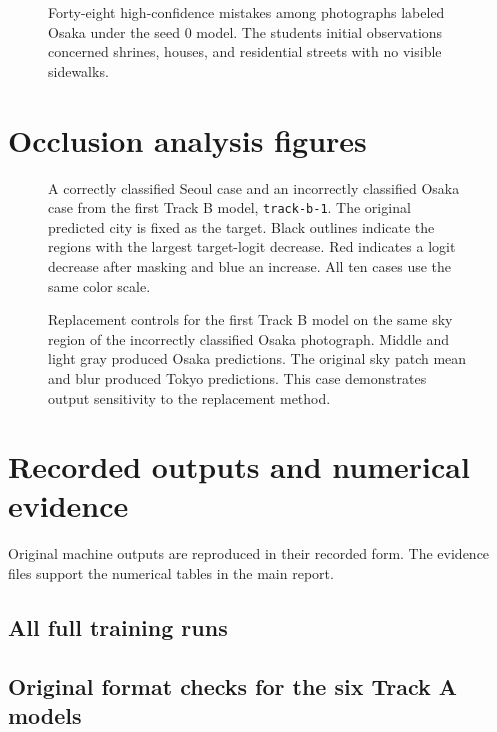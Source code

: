 \documentclass[11pt]{article}
\begin{document}
\clearpage
\begin{figure}[htbp]
\centering
{}
\caption{Forty-eight high-confidence mistakes among photographs labeled Osaka
under the seed 0 model. The student\textquotesingle{}s initial observations concerned shrines,
houses, and residential streets with no visible sidewalks.}
\end{figure}

\clearpage
\section{Occlusion analysis figures}

\begin{figure}[!ht]
\centering
{}
\caption{A correctly classified Seoul case and an incorrectly classified
Osaka case from the first Track B model, \texttt{track-b-1}.
The original predicted city is fixed as the target. Black
outlines indicate the regions with the largest target-logit decrease.
Red indicates a logit decrease after masking and blue an increase.
All ten cases use the same color scale.}
\end{figure}

\clearpage
\begin{figure}[!ht]
\centering
{}
\caption{Replacement controls for the first Track B model on the same
sky region of the incorrectly classified Osaka photograph. Middle and light gray produced Osaka
predictions. The original sky patch mean and blur produced Tokyo predictions.
This case demonstrates output sensitivity to the replacement method.}
\end{figure}

\clearpage
\section{Recorded outputs and numerical evidence}

Original machine outputs are reproduced in their recorded form. The evidence
files support the numerical tables in the main report.

\subsection*{All full training runs}

\subsection*{Original format checks for the six Track A models}
\end{document}
